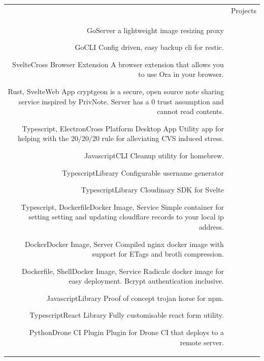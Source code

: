 \documentclass[letterpaper,12pt]{article}
\newcommand{\headingfont}{\Large\color{accent}\BluuNext}
\newenvironment{SectionTable}[1]{
	\renewcommand*{\arraystretch}{1.7}
	\setlength{\tabcolsep}{10pt}
	\begin{longtable}{Rp{5.2in}} & #1 \\}
{\end{longtable}\vspace{-.3cm}}
\begin{document}
\begin{SectionTable}{\headingfont Projects}

  {Go}{Server}
  {
    a lightweight image resizing proxy
  }

  {Go}{CLI}
  {
    Config driven, easy backup cli for restic.
  }

  {Svelte}{Cross Browser Extension}
  {
    A browser extension that allows you to use Ora in your browser.
  }

  {Rust, Svelte}{Web App}{
    cryptgeon is a secure, open source note sharing service inspired by PrivNote. Server has a 0 trust assumption and cannot read contents.
  }

  {Typescript, Electron}{Cross Platform Desktop App}{
    Utility app for helping with the 20/20/20 rule for alleviating CVS induced stress.
  }

  {Javascript}{CLI}{
    Cleanup utility for homebrew.
  }

  {Typescript}{Library}{
    Configurable username generator
  }

  {Typescript}{Library}{
    Cloudinary SDK for Svelte
  }

  {Typescript, Dockerfile}{Docker Image, Service}{
    Simple container for setting setting and updating cloudflare records to your local ip address.
  }

  {Docker}{Docker Image, Server}{
    Compiled nginx docker image with support for ETags and brotli compression.
  }

  {Dockerfile, Shell}{Docker Image, Service}{
    Radicale docker image for easy deployment. Bcrypt authentication inclusive.
  }

  {Javascript}{Library}{
    Proof of concept trojan horse for npm.
  }

  {Typescript}{React Library}{
    Fully customisable react form utility.
  }

  {Python}{Drone CI Plugin}{
    Plugin for Drone CI that deploys to a remote server.
  }
\end{SectionTable}
\end{document}
